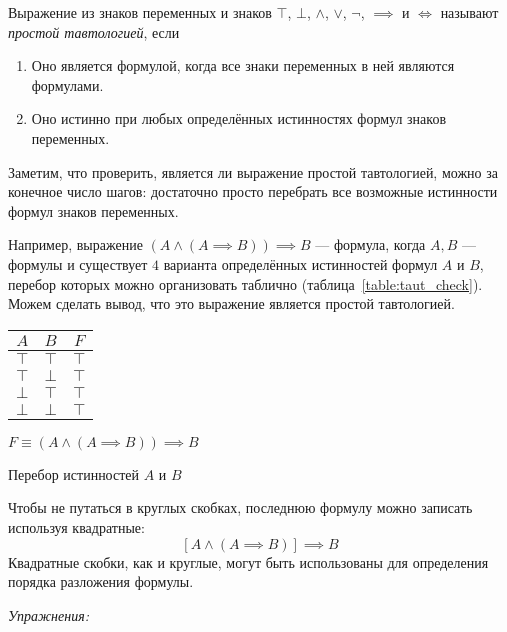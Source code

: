Выражение из знаков переменных и знаков $\top$, $\bot$, $\land$, $\lor$, $\lnot$,
$\implies$ и $\iff$ называют
{\it простой тавтологией}, если
\begin{enumerate}
  \item{}Оно является формулой, когда все знаки переменных в ней
  являются формулами.
  \item{}Оно истинно при любых определённых истинностях формул знаков переменных.
\end{enumerate}

Заметим, что проверить, является ли выражение простой тавтологией,
можно за конечное число шагов: достаточно просто перебрать все
возможные истинности формул знаков переменных.

Например, выражение ${(A\land (A\implies B))\implies B}$ --- формула,
когда $A,B$ --- формулы и
существует $4$ варианта определённых истинностей формул $A$ и $B$,
перебор которых можно организовать таблично (таблица~\ref{table:taut_check}).
Можем сделать вывод, что это выражение является простой тавтологией.
\begin{margintable}
  \begin{tabular}{cc|c}
    $A$    & $B$    & $F$    \\\hline
    $\top$ & $\top$ & $\top$ \\
    $\top$ & $\bot$ & $\top$ \\
    $\bot$ & $\top$ & $\top$ \\
    $\bot$ & $\bot$ & $\top$
  \end{tabular}

  \vspace{0.5em}
  $F\equiv{(A\land (A\implies B))\implies B}$

  \caption{Перебор истинностей $A$ и $B$}\label{table:taut_check}
\end{margintable}

Чтобы не путаться в круглых скобках, последнюю формулу можно записать используя
квадратные:
\[
  [A\land (A\implies B)]\implies B
\]
Квадратные скобки, как и круглые, могут быть использованы для определения порядка
разложения формулы.

\vspace{1em}
{\it Упражнения:}

